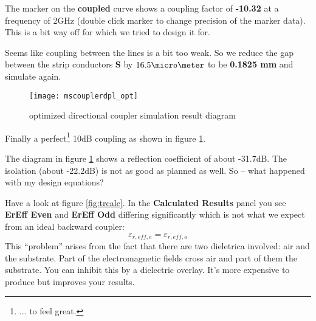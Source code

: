 The marker on the \textbf{coupled} curve shows a coupling factor of
\textbf{-10.32} at a frequency of 2GHz (double click marker to change
precision of the marker data).  This is a bit way off for which we
tried to design it for.

\addvspace{12pt}

Seems like coupling between the lines is a bit too weak.  So we reduce
the gap between the strip conductors \textbf{S} by $16.5\micro\meter$ to
be \textbf{0.1825 mm} and simulate again.

\begin{figure}[ht]
  \centering
  \texttt{[image: mscouplerdpl\_opt]}
  \caption{optimized directional coupler simulation result diagram}
  \label{fig:mscouplerdpl_opt}
\end{figure}
\FloatBarrier

Finally a perfect\footnote{... to feel great.} 10dB coupling as shown
in figure \ref{fig:mscouplerdpl_opt}.


The diagram in figure \ref{fig:mscouplerdpl_opt} shows a reflection
coefficient of about -31.7dB.  The isolation (about -22.2dB) is not as
good as planned as well.  So -- what happened with my design
equations?

\addvspace{12pt}

Have a look at figure \ref{fig:trcalc}.  In the \textbf{Calculated
Results} panel you see \textbf{ErEff Even} and \textbf{ErEff Odd}
differing significantly which is not what we expect from an ideal
backward coupler:
\begin{equation*}
\varepsilon_{r,eff,e} = \varepsilon_{r,eff,o}
\end{equation*}
This ``problem'' arises from the fact that there are two dieletrica
involved: air and the substrate.  Part of the electromagnetic fields
cross air and part of them the substrate.  You can inhibit this by a
dielectric overlay.  It's more expensive to produce but improves your
results.
